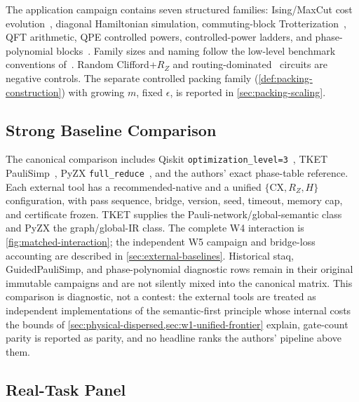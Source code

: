 \documentclass[aps,prx,reprint,floatfix,superscriptaddress]{revtex4-2}
\begin{document}
The application campaign contains seven structured families: Ising/MaxCut
cost evolution~\cite{farhi2014qaoa}, diagonal Hamiltonian simulation,
commuting-block Trotterization~\cite{childs2021trotter}, QFT arithmetic,
QPE controlled powers, controlled-power
ladders, and phase-polynomial blocks~\cite{amy2019cnot}.  Family sizes and
naming follow the low-level benchmark
conventions of~\cite{li2023qasmbench,quetschlich2023mqt}.  Random
Clifford+$R_Z$ and
routing-dominated~\cite{cowtan2019routing,li2019sabre} circuits are
negative controls.  The separate controlled
packing family
(\cref{def:packing-construction}) with growing $m$, fixed $\epsilon$,
is reported in \cref{sec:packing-scaling}.

\subsection{Strong Baseline Comparison}

The canonical comparison includes Qiskit
\texttt{optimization\_level=3}~\cite{javadi2024qiskit}, TKET
PauliSimp~\cite{sivarajah2021tket,cowtan2020phase}, PyZX
\texttt{full\_reduce}~\cite{kissinger2020pyzx}, and the authors' exact
phase-table reference.  Each external tool has a recommended-native and a
unified $\{\mathrm{CX},R_Z,H\}$ configuration, with pass sequence, bridge,
version, seed, timeout, memory cap, and certificate frozen.  TKET supplies the
Pauli-network/global-semantic class and PyZX the graph/global-IR class.  The
complete W4 interaction is \cref{fig:matched-interaction}; the independent W5
campaign and bridge-loss accounting are described in
\cref{sec:external-baselines}.  Historical staq, GuidedPauliSimp, and
phase-polynomial diagnostic rows remain in their original immutable campaigns
and are not silently mixed into the canonical matrix.  This comparison is
diagnostic, not a contest: the external tools are treated as independent
implementations of the semantic-first principle whose internal costs the
bounds of \cref{sec:physical-dispersed,sec:w1-unified-frontier} explain,
gate-count parity is reported as parity, and no headline ranks the
authors' pipeline above them.

\subsection{Real-Task Panel}
\end{document}
